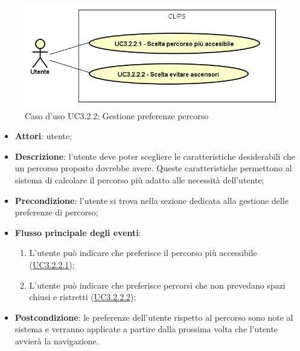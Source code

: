 \documentclass[../AnalisiDeiRequisiti.tex]{subfiles}
\begin{document}
        \begin{figure}[!h]
            \centering
            \includegraphics[scale=0.95, width=\textwidth]{img/UC3-2-2.png}
            \caption{Caso d'uso UC3.2.2: Gestione preferenze percorso}\label{fig:UC3.2.2} 
        \end{figure}
\begin{itemize}
\item \textbf{Attori}: utente;
\item \textbf{Descrizione}: l'utente deve poter scegliere le caratteristiche desiderabili che un percorso proposto dovrebbe avere. Queste caratteristiche permettono al sistema di calcolare il percorso più adatto alle necessità dell'utente; 
      \item \textbf{Precondizione}: l'utente si trova nella sezione dedicata alla gestione delle preferenze di percorso;

        \item \textbf{Flusso principale degli eventi}:
          \begin{enumerate}
          \item L'utente può indicare che preferisce il percorso più accessibile (\hyperlink{UC3.2.2.1}{UC3.2.2.1});
          \item L'utente può indicare che preferisce percorsi che non prevedano spazi chiusi e ristretti  (\hyperlink{UC3.2.2.2}{UC3.2.2.2});

      \end{enumerate}
    \item \textbf{Postcondizione}: le preferenze dell'utente rispetto al percorso sono note al sistema e verranno applicate a partire dalla prossima volta che l'utente avvierà la navigazione.
  \end{itemize}
\hypertarget{UC3.2.2.1}{}
\end{document}
